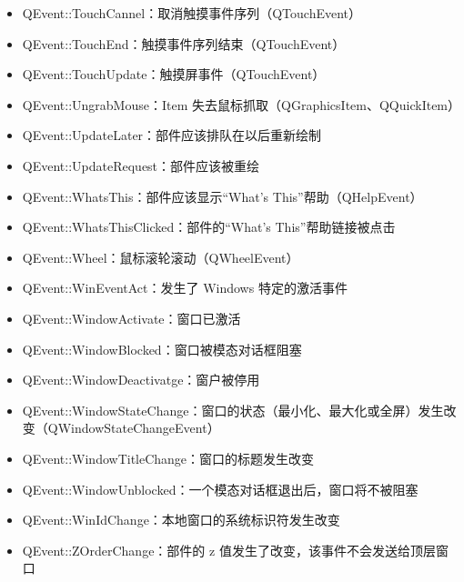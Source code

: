 \begin{itemize}
\item{QEvent::TouchCannel：取消触摸事件序列（QTouchEvent）}
\item{QEvent::TouchEnd：触摸事件序列结束（QTouchEvent）}
\item{QEvent::TouchUpdate：触摸屏事件（QTouchEvent）}
\item{QEvent::UngrabMouse：Item 失去鼠标抓取（QGraphicsItem、QQuickItem）}
\item{QEvent::UpdateLater：部件应该排队在以后重新绘制}
\item{QEvent::UpdateRequest：部件应该被重绘}
\item{QEvent::WhatsThis：部件应该显示“What’s This”帮助（QHelpEvent）}
\item{QEvent::WhatsThisClicked：部件的“What’s This”帮助链接被点击}
\item{QEvent::Wheel：鼠标滚轮滚动（QWheelEvent）}
\item{QEvent::WinEventAct：发生了 Windows 特定的激活事件}
\item{QEvent::WindowActivate：窗口已激活}
\item{QEvent::WindowBlocked：窗口被模态对话框阻塞}
\item{QEvent::WindowDeactivatge：窗户被停用}
\item{QEvent::WindowStateChange：窗口的状态（最小化、最大化或全屏）发生改变（QWindowStateChangeEvent）}
\item{QEvent::WindowTitleChange：窗口的标题发生改变}
\item{QEvent::WindowUnblocked：一个模态对话框退出后，窗口将不被阻塞}
\item{QEvent::WinIdChange：本地窗口的系统标识符发生改变}
\item{QEvent::ZOrderChange：部件的 z 值发生了改变，该事件不会发送给顶层窗口}












































\end{itemize}









